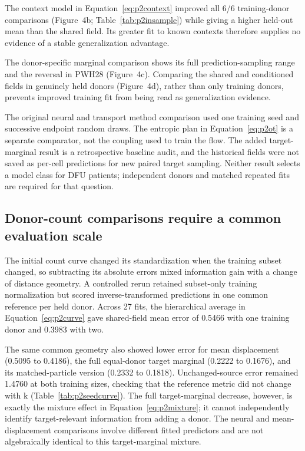 \documentclass[10pt,a4paper]{article}
\begin{document}
The context model in Equation~\eqref{eq:p2context} improved all 6/6 training-donor comparisons (Figure~4b; Table~\ref{tab:p2insample}) while giving a higher held-out mean than the shared field. Its greater fit to known contexts therefore supplies no evidence of a stable generalization advantage.




The donor-specific marginal comparison shows its full prediction-sampling range and the reversal in PWH28 (Figure~4c). Comparing the shared and conditioned fields in genuinely held donors (Figure~4d), rather than only training donors, prevents improved training fit from being read as generalization evidence.

The original neural and transport method comparison used one training seed and successive endpoint random draws. The entropic plan in Equation~\eqref{eq:p2ot} is a separate comparator, not the coupling used to train the flow. The added target-marginal result is a retrospective baseline audit, and the historical fields were not saved as per-cell predictions for new paired target sampling. Neither result selects a model class for DFU patients; independent donors and matched repeated fits are required for that question.

\subsection{Donor-count comparisons require a common evaluation scale}

The initial count curve changed its standardization when the training subset changed, so subtracting its absolute errors mixed information gain with a change of distance geometry. A controlled rerun retained subset-only training normalization but scored inverse-transformed predictions in one common reference per held donor. Across 27 fits, the hierarchical average in Equation~\eqref{eq:p2curve} gave shared-field mean error of 0.5466 with one training donor and 0.3983 with two.

The same common geometry also showed lower error for mean displacement (0.5095 to 0.4186), the full equal-donor target marginal (0.2222 to 0.1676), and its matched-particle version (0.2332 to 0.1818). Unchanged-source error remained 1.4760 at both training sizes, checking that the reference metric did not change with k (Table~\ref{tab:p2seedcurve}). The full target-marginal decrease, however, is exactly the mixture effect in Equation~\eqref{eq:p2mixture}; it cannot independently identify target-relevant information from adding a donor. The neural and mean-displacement comparisons involve different fitted predictors and are not algebraically identical to this target-marginal mixture.
\end{document}
